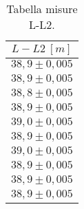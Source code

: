 \begin{table}[H]
    \centering
        \begin{tabular}{|c|}
        \hline
        $ L-L2~[m] $\\
        \hline
        $ 38,9 \pm 0,005 $\\
        \hline
        $ 38,9 \pm 0,005 $\\
        \hline
        $ 38,8 \pm 0,005 $\\
        \hline
        $ 38,9 \pm 0,005 $\\
        \hline
        $ 39,0 \pm 0,005 $\\
        \hline
        $ 38,9 \pm 0,005 $\\
        \hline
        $ 39,0 \pm 0,005 $\\
        \hline
        $ 38,9 \pm 0,005 $\\
        \hline
        $ 38,9 \pm 0,005 $\\
        \hline
        $ 38,9 \pm 0,005 $\\
        \hline
        \end{tabular}
    \caption{Tabella misure L-L2.}
\end{table}